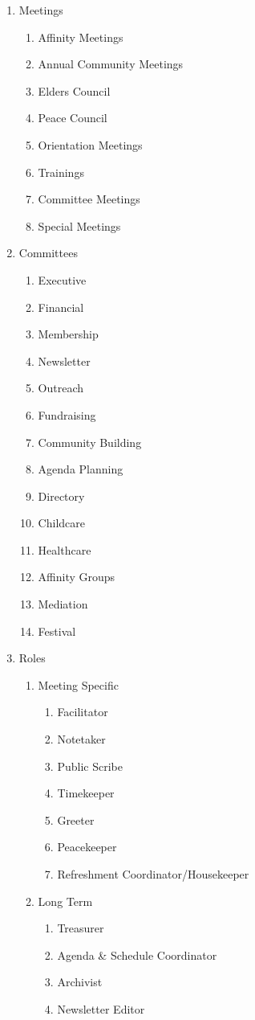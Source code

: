 \begin{enumerate}
\item {}Meetings

\begin{enumerate}
\item Affinity Meetings
\item Annual Community Meetings
\item Elders Council
\item Peace Council
\item Orientation Meetings
\item Trainings
\item Committee Meetings
\item Special Meetings
\end{enumerate}

\item Committees

\begin{enumerate}
\item Executive
\item Financial
\item Membership
\item Newsletter
\item Outreach
\item Fundraising
\item Community Building
\item {}Agenda Planning
\item Directory
\item Childcare
\item Healthcare
\item Affinity Groups
\item Mediation
\item Festival
\end{enumerate}

\item {}Roles

\begin{enumerate}
\item {}Meeting Specific
\begin{enumerate}
\item {}Facilitator
\item Notetaker
\item Public Scribe
\item Timekeeper
\item Greeter
\item Peacekeeper
\item Refreshment Coordinator/Housekeeper
\end{enumerate}
\item Long Term
\begin{enumerate}
\item Treasurer
\item {}Agenda \& Schedule Coordinator
\item Archivist
\item Newsletter Editor
\end{enumerate}
\end{enumerate}
\end{enumerate}

